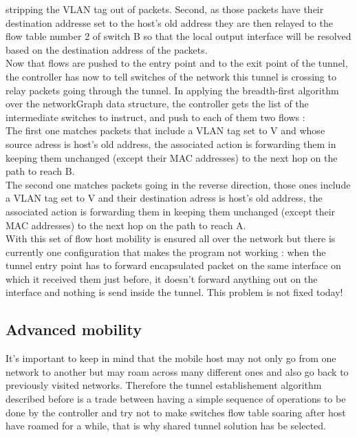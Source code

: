 \documentclass{article}
\begin{document}
stripping the VLAN tag out of packets. Second, as those packets
have their destination addresse set to the host's old address they
are then relayed to the flow table number 2 of switch B so that
the local output interface will be resolved based on the
destination address of the packets.\\
\newline
Now that flows are pushed to the entry point and to the exit point of
the tunnel, the controller has now to tell switches of the network
this tunnel is crossing to relay packets going through the tunnel. In
applying the breadth-first algorithm over the networkGraph data
structure, the controller gets the list of the intermediate switches to
instruct, and push to each of them two flows : \\
\newline
The first one matches packets that include a VLAN tag set to V and
whose source adress is host's old address, the associated action is
forwarding them in keeping them unchanged (except their MAC
addresses) to the next hop on the path to reach B.\\
\newline
The second one matches packets going in the reverse direction, those
ones include a VLAN tag set to V and their destination adress is host's
old address, the associated action is forwarding them in keeping them
unchanged (except their MAC addresses) to the next hop on the path to
reach A.\\
\newline
With this set of flow host mobility is ensured all over the network
but there is currently one configuration that makes the program not
working : when the tunnel entry point has to forward encapsulated
packet on the same interface on which it received them just before,
it doesn't forward anything out on the interface and nothing is send
inside the tunnel. This problem is not fixed today!

\subsection{Advanced mobility}
It's important to keep in mind that the mobile host may not only go
from one network to another but may roam across many different ones
and also go back to previously visited networks. Therefore the tunnel
establishement algorithm described before is a trade between having a
simple sequence of operations to be done by the controller and try not
to make switches flow table soaring after host have roamed for a
while, that is why shared tunnel solution has be selected.
\end{document}
